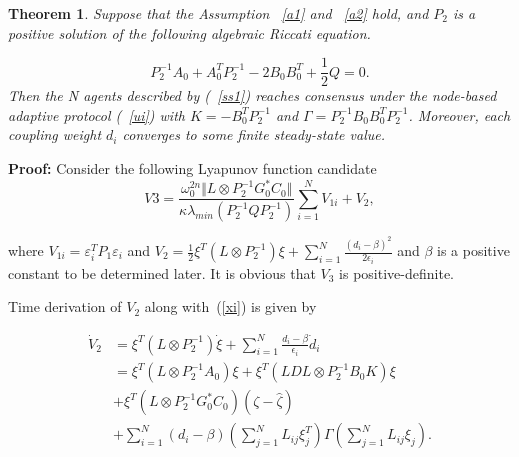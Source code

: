 \documentclass[english]{cccconf}
\newtheorem{theorem}{\bf Theorem}
\begin{document}
\begin{theorem}\label{th1}
Suppose that the Assumption ~\ref{a1} and ~\ref{a2} hold, and $P_2$ is a positive solution of the following algebraic Riccati equation.

\begin{equation}
\label{T2}
P^{-1}_{2} A_{0} + A_{0}^T P^{-1}_{2} - 2 B_{0} B_{0}^{T} + \frac{1}{2}Q = 0.
\end{equation}
Then the N agents described by (~\ref{ss1}) reaches consensus under the node-based adaptive protocol (~\ref{ui}) with $K=-B_0^T P_2^{-1}$ and $\Gamma = P_2^{-1}B_0 B_0^T P_2^{-1}$. Moreover, each coupling weight $d_i$ converges to some finite steady-state value.

 

\end{theorem}

\textbf{Proof:} Consider the following Lyapunov function candidate
\begin{equation}
  \label{p1}
  V{3}= \frac{\omega^{2n}_0 \Vert L \otimes P^{-1}_{2}G_{0}^{*}C_0 \Vert}{\kappa \lambda_{min}(P_{2}^{-1} Q P_{2}^{-1})} \sum_{i=1}^N V_{1i} + V_2,
\end{equation}

where $V_{1i}=\varepsilon^T_i P_1 \varepsilon_i$ and $V_2=\frac{1}{2} \xi^T ( L \otimes P^{-1}_2)\xi + \sum_{i=1}^N \frac{(d_i-\beta)^2}{2\epsilon_i}$ and $\beta$ is a positive constant to be determined later.
It is obvious that $V_3$ is positive-definite. 


Time derivation of $V_2$ along with~(\ref{xi}) is given by 

 
\begin{equation}
  \label{p3}
  \begin{aligned}
  \dot V_{2} &= \xi^T ( L \otimes P^{-1}_2)\dot \xi + \sum_{i=1}^N\frac{d_i-\beta}{\epsilon_i} \dot d_i \\
  &= \xi^T ( L \otimes P^{-1}_{2} A_{0}) \xi + \xi^T ( LDL \otimes P^{-1}_{2} B_{0} K) \xi \\& + \xi^T ( L \otimes P^{-1}_{2} G_{0}^{*} C_0) (\zeta - \hat \zeta) \\& + \sum_{i=1}^N(d_i-\beta)(\sum_{j=1}^N L_{ij} \xi_{j}^T)\Gamma(\sum_{j=1}^N L_{ij} \xi_{j}).
  \end{aligned}
\end{equation}
\end{document}
